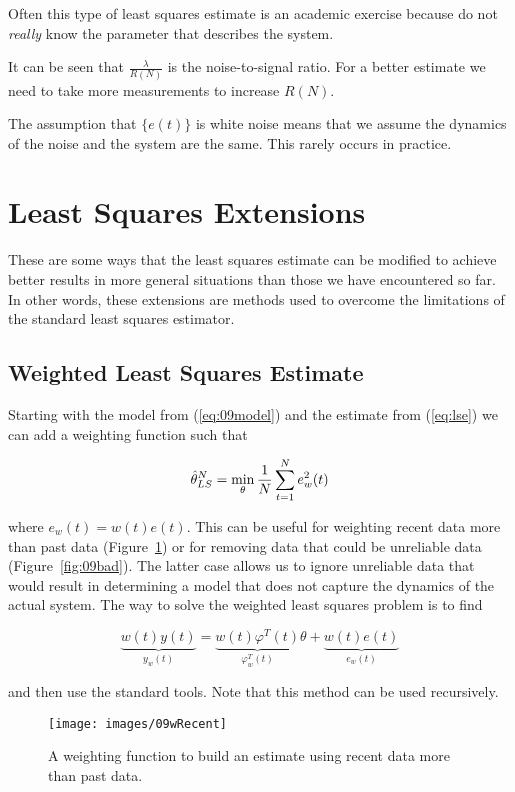 Often this type of least squares estimate is an academic exercise because do not \textit{really} know the parameter that describes the system.

It can be seen that $\frac{\lambda}{R(N)}$ is the noise-to-signal ratio.
For a better estimate we need to take more measurements to increase $R(N)$.

The assumption that $\{e(t)\}$ is white noise means that we assume the dynamics of the noise and the system are the same.
This rarely occurs in practice.

\section{Least Squares Extensions}
These are some ways that the least squares estimate can be modified to achieve better results in more general situations than those we have encountered so far.
In other words, these extensions are methods used to overcome the limitations of the standard least squares estimator.

\subsection{Weighted Least Squares Estimate}
Starting with the model from (\ref{eq:09model}) and the estimate from (\ref{eq:lse}) we can add a weighting function such that

\begin{equation*}
\hat{\theta}_{LS}^N = \min_\theta \frac{1}{N}\sum_{t=1}^N e_w^2(t)
\end{equation*}

where $e_w(t)=w(t)e(t)$.
This can be useful for weighting recent data more than past data (Figure~\ref{fig:09wRecent}) or for removing data that could be unreliable data (Figure~\ref{fig:09bad}).
The latter case allows us to ignore unreliable data that would result in determining a model that does not capture the dynamics of the actual system.
The way to solve the weighted least squares problem is to find

\begin{equation*}
\underbrace{w(t)y(t)}_{y_w(t)} = \underbrace{w(t)\varphi^T(t)}_{\varphi_w^T(t)}\theta + \underbrace{w(t)e(t)}_{e_w(t)}
\end{equation*}

and then use the standard tools.
Note that this method can be used recursively.

\begin{figure}[ht!]
\centering
\texttt{[image: images/09wRecent]}
\caption{A weighting function to build an estimate using recent data more than past data.}%
\label{fig:09wRecent}
\end{figure}

